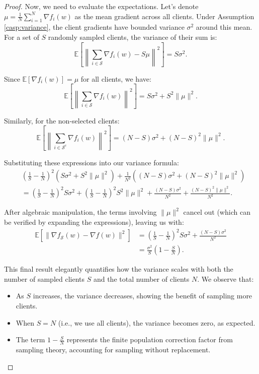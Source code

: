 \begin{proof}
    Now, we need to evaluate the expectations. Let's denote \(\mu = \frac{1}{N}\sum_{i=1}^N \nabla f_i(w)\) as the mean gradient across all clients. Under Assumption \ref{casp:variance}, the client gradients have bounded variance \(\sigma^2\) around this mean. For a set of \(S\) randomly sampled clients, the variance of their sum is:
    \[
        \mathbb{E}\left[\left\|\sum_{i \in \mathcal{S}} \nabla f_i(w) - S\mu\right\|^2\right] = S \sigma^2.
    \]
    
    Since \(\mathbb{E}[\nabla f_i(w)] = \mu\) for all clients, we have:
    \[
        \mathbb{E}\left[\left\|\sum_{i \in \mathcal{S}} \nabla f_i(w)\right\|^2\right] = S \sigma^2 + S^2 \|\mu\|^2.
    \]
    
    Similarly, for the non-selected clients:
    \[
        \mathbb{E}\left[\left\|\sum_{i \in \mathcal{S}^c} \nabla f_i(w)\right\|^2\right] = (N-S) \sigma^2 + (N-S)^2 \|\mu\|^2.
    \]
    
    Substituting these expressions into our variance formula:
    \begin{align*}
        &\left(\frac{1}{S} - \frac{1}{N}\right)^2 (S \sigma^2 + S^2 \|\mu\|^2) + \frac{1}{N^2}((N-S) \sigma^2 + (N-S)^2 \|\mu\|^2) \\
        &= \left(\frac{1}{S} - \frac{1}{N}\right)^2 S \sigma^2 + \left(\frac{1}{S} - \frac{1}{N}\right)^2 S^2 \|\mu\|^2 + \frac{(N-S)\sigma^2}{N^2} + \frac{(N-S)^2\|\mu\|^2}{N^2}.
    \end{align*}
    
    After algebraic manipulation, the terms involving \(\|\mu\|^2\) cancel out (which can be verified by expanding the expressions), leaving us with:
    \begin{align*}
        \mathbb{E}[\|\nabla f_{\mathcal{S}}(w) - \nabla f(w)\|^2] &= \left(\frac{1}{S} - \frac{1}{N}\right)^2 S \sigma^2 + \frac{(N-S)\sigma^2}{N^2} \\
        &= \frac{\sigma^2}{S} \left(1 - \frac{S}{N}\right).
    \end{align*}
    
    This final result elegantly quantifies how the variance scales with both the number of sampled clients \(S\) and the total number of clients \(N\). We observe that:
    \begin{itemize}
        \item As \(S\) increases, the variance decreases, showing the benefit of sampling more clients.
        \item When \(S = N\) (i.e., we use all clients), the variance becomes zero, as expected.
        \item The term \(1 - \frac{S}{N}\) represents the finite population correction factor from sampling theory, accounting for sampling without replacement.
    \end{itemize}
\end{proof}

